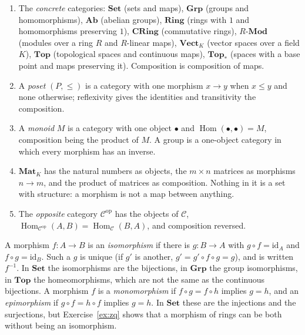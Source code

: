\begin{example}\label{ex:categories}
\leavevmode
\begin{enumerate}[label=(\alph*)]
\item The \emph{concrete} categories: $\mathbf{Set}$ (sets and maps), $\mathbf{Grp}$ (groups and homomorphisms), $\mathbf{Ab}$ (abelian groups), $\mathbf{Ring}$ (rings with $1$ and
homomorphisms preserving $1$), $\mathbf{CRing}$ (commutative rings), $R\text{-}\mathbf{Mod}$ (modules over a ring $R$ and $R$-linear maps), $\mathbf{Vect}_K$ (vector spaces over a field $K$),
$\mathbf{Top}$ (topological spaces and continuous maps), $\mathbf{Top}_*$ (spaces with a base point and maps preserving it). Composition is composition of maps.
\item A \emph{poset} $(P,\le)$ is a category with one morphism $x\to y$ when $x\le y$ and none otherwise; reflexivity gives the identities and transitivity the composition.
\item A \emph{monoid} $M$ is a category with one object $\bullet$ and $\operatorname{Hom}(\bullet,\bullet)=M$, composition being the product of $M$. A group is a one-object category in which every
morphism has an inverse.
\item $\mathbf{Mat}_K$ has the natural numbers as objects, the $m\times n$ matrices as morphisms $n\to m$, and the product of matrices as composition. Nothing in it is a set with
structure: a morphism is not a map between anything.
\item The \emph{opposite} category $\mathcal C^{\mathrm{op}}$ has the objects of $\mathcal C$, $\operatorname{Hom}_{\mathcal C^{\mathrm{op}}}(A,B)=\operatorname{Hom}_{\mathcal C}(B,A)$, and composition reversed.
\end{enumerate}
\end{example}

A morphism $f\colon A\to B$ is an \emph{isomorphism} if there is $g\colon B\to A$ with $g\circ f=\mathrm{id}_A$ and $f\circ g=\mathrm{id}_B$. Such a $g$ is unique (if $g'$ is another,
$g'=g'\circ f\circ g=g$), and is written $f^{-1}$. In $\mathbf{Set}$ the isomorphisms are the bijections, in $\mathbf{Grp}$ the group isomorphisms, in $\mathbf{Top}$ the homeomorphisms,
which are not the same as the continuous bijections. A morphism $f$ is a \emph{monomorphism} if $f\circ g=f\circ h$ implies $g=h$, and an \emph{epimorphism} if $g\circ f=h\circ f$ implies $g=h$.
In $\mathbf{Set}$ these are the injections and the surjections, but Exercise~\ref{ex:zq} shows that a morphism of rings can be both without being an isomorphism.

